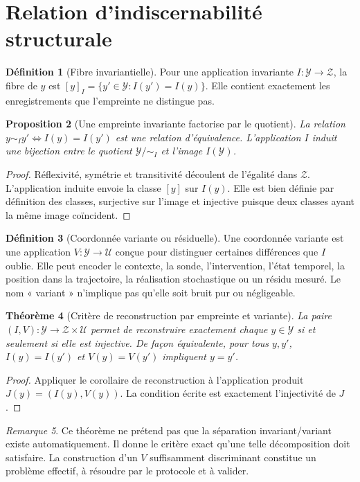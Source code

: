 \documentclass[11pt,oneside]{book}
\newtheorem{theoreme}{Théorème}[chapter]
\newtheorem{proposition}[theoreme]{Proposition}
\theoremstyle{definition}
\newtheorem{definition}[theoreme]{Définition}
\theoremstyle{remark}
\newtheorem{remarque}[theoreme]{Remarque}
\newcommand{\Y}{\mathcal Y}
\newcommand{\Z}{\mathcal Z}
\newcommand{\U}{\mathcal U}
\newcommand{\1}{\mathbf 1}
\begin{document}
\section{Relation d'indiscernabilité structurale}
\begin{definition}[Fibre invariantielle]
Pour une application invariante \(I:\Y\to\Z\), la fibre de \(y\) est \([y]_I=\{y'\in\Y:I(y')=I(y)\}\). Elle contient exactement les enregistrements que l'empreinte ne distingue pas.
\end{definition}
\begin{proposition}[Une empreinte invariante factorise par le quotient]
La relation \(y\sim_I y'\iff I(y)=I(y')\) est une relation d'équivalence. L'application \(I\) induit une bijection entre le quotient \(\Y/\!\sim_I\) et l'image \(I(\Y)\).
\end{proposition}
\begin{proof}
Réflexivité, symétrie et transitivité découlent de l'égalité dans \(\Z\). L'application induite envoie la classe \([y]\) sur \(I(y)\). Elle est bien définie par définition des classes, surjective sur l'image et injective puisque deux classes ayant la même image coïncident.\end{proof}
\begin{definition}[Coordonnée variante ou résiduelle]
Une coordonnée variante est une application \(V:\Y\to\U\) conçue pour distinguer certaines différences que \(I\) oublie. Elle peut encoder le contexte, la sonde, l'intervention, l'état temporel, la position dans la trajectoire, la réalisation stochastique ou un résidu mesuré. Le nom « variant » n'implique pas qu'elle soit bruit pur ou négligeable.
\end{definition}
\begin{theoreme}[Critère de reconstruction par empreinte et variante]
La paire \((I,V):\Y\to\Z\times\U\) permet de reconstruire exactement chaque \(y\in\Y\) si et seulement si elle est injective. De façon équivalente, pour tous \(y,y'\), \(I(y)=I(y')\) et \(V(y)=V(y')\) impliquent \(y=y'\).
\end{theoreme}
\begin{proof}
Appliquer le corollaire de reconstruction à l'application produit \(J(y)=(I(y),V(y))\). La condition écrite est exactement l'injectivité de \(J\).\end{proof}
\begin{remarque}
Ce théorème ne prétend pas que la séparation invariant/variant existe automatiquement. Il donne le critère exact qu'une telle décomposition doit satisfaire. La construction d'un \(V\) suffisamment discriminant constitue un problème effectif, à résoudre par le protocole et à valider.
\end{remarque}
\end{document}
